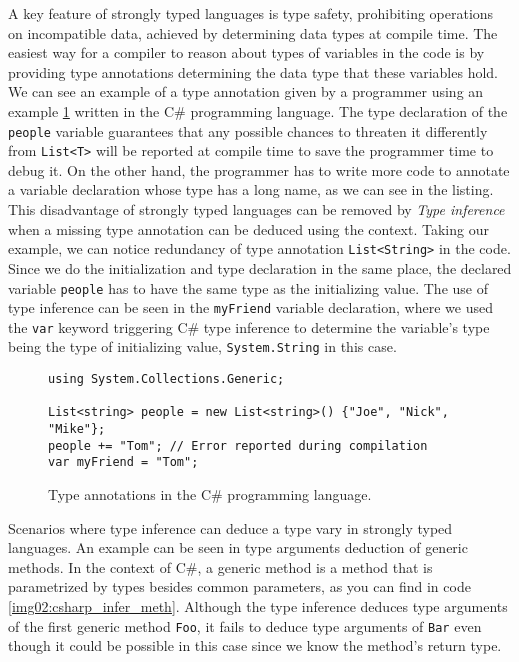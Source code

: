 A key feature of strongly typed languages is type safety, prohibiting operations on incompatible data, achieved by determining data types at compile time. 
The easiest way for a compiler to reason about types of variables in the code is by providing type annotations determining the data type that these variables hold. 
We can see an example of a type annotation given by a programmer using an example \ref{img01:csharp_type_anot} written in the C\# programming language. 
The type declaration of the \texttt{people} variable guarantees that any possible chances to threaten it differently from \texttt{List<T>} will be reported at compile time to save the programmer time to debug it. 
On the other hand, the programmer has to write more code to annotate a variable declaration whose type has a long name, as we can see in the listing. 
This disadvantage of strongly typed languages can be removed by {\it Type inference} when a missing type annotation can be deduced using the context. 
Taking our example, we can notice redundancy of type annotation \texttt{List<String>} in the code. Since we do the initialization and type declaration in the same place, the declared variable \texttt{people} has to have the same type as the initializing value. 
The use of type inference can be seen in the \texttt{myFriend} variable declaration, where we used the \texttt{var} keyword triggering C\# type inference to determine the variable's type being the type of initializing value, \texttt{System.String} in this case.
\par
\begin{figure}
\begin{lstlisting}
using System.Collections.Generic;

List<string> people = new List<string>() {"Joe", "Nick", "Mike"};
people += "Tom"; // Error reported during compilation
var myFriend = "Tom";
\end{lstlisting}
\caption{Type annotations in the C\# programming language.}
\label{img01:csharp_type_anot}
\end{figure}
\par
{}
Scenarios where type inference can deduce a type vary in strongly typed languages. 
An example can be seen in type arguments deduction of generic methods. 
In the context of C\#, a generic method is a method that is parametrized by types besides common parameters, as you can find in code \ref{img02:csharp_infer_meth}. 
Although the type inference deduces type arguments of the first generic method \texttt{Foo}, it fails to deduce type arguments of \texttt{Bar} even though it could be possible in this case since we know the method's return type.
